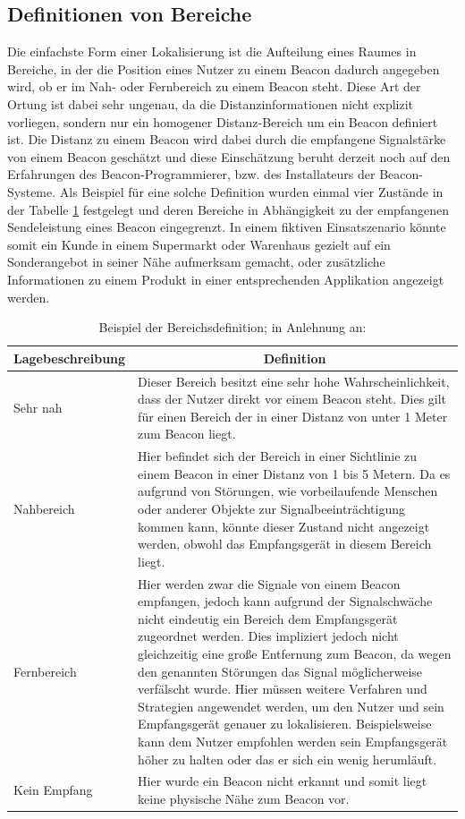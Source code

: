 \subsection{Definitionen von Bereiche}
Die einfachste Form einer Lokalisierung ist die Aufteilung eines Raumes in Bereiche, in der die Position eines Nutzer zu einem Beacon dadurch angegeben wird, ob er im Nah- oder Fernbereich zu einem Beacon steht. Diese Art der Ortung ist dabei sehr ungenau, da die Distanzinformationen nicht explizit vorliegen, sondern nur ein homogener Distanz-Bereich um ein Beacon definiert ist. Die Distanz zu einem Beacon wird dabei durch die empfangene Signalstärke von einem Beacon geschätzt und diese Einschätzung beruht derzeit noch auf den Erfahrungen des Beacon-Programmierer, bzw. des Installateurs der Beacon-Systeme. Als Beispiel für eine solche Definition wurden einmal vier Zustände in der Tabelle \ref{table:Ranging} festgelegt und deren Bereiche in Abhängigkeit zu der empfangenen Sendeleistung eines Beacon eingegrenzt. In einem fiktiven Einsatszenario könnte somit ein Kunde in einem Supermarkt oder Warenhaus gezielt auf ein Sonderangebot in seiner Nähe aufmerksam gemacht, oder zusätzliche Informationen zu einem Produkt in einer entsprechenden Applikation angezeigt werden.    
\begin{table}[H]
\centering
\begin{tabular}{|>{\centering}p{4cm}|m{12cm}|}
\hline
\rowcolor{gray} \textbf{Lagebeschreibung} & \multicolumn{1}{c}{\textbf{Definition}} \\ \hline
Sehr nah & Dieser Bereich besitzt eine sehr hohe Wahrscheinlichkeit, dass der Nutzer direkt vor einem Beacon steht. Dies gilt für einen Bereich der in einer Distanz von unter 1 Meter zum Beacon liegt. \\ \hline
Nahbereich & Hier befindet sich der Bereich in einer Sichtlinie zu einem Beacon in einer Distanz von 1 bis 5 Metern. Da es aufgrund von Störungen, wie vorbeilaufende Menschen oder anderer Objekte zur Signalbeeinträchtigung kommen kann, könnte dieser Zustand nicht angezeigt werden, obwohl das Empfangsgerät in diesem Bereich liegt.\\ \hline
Fernbereich & Hier werden zwar die Signale von einem Beacon empfangen, jedoch kann aufgrund der Signalschwäche nicht eindeutig ein Bereich dem Empfangsgerät zugeordnet werden. Dies impliziert jedoch nicht gleichzeitig eine große Entfernung zum Beacon, da wegen den genannten Störungen das Signal möglicherweise verfälscht wurde. Hier müssen weitere Verfahren und Strategien angewendet werden, um den Nutzer und sein Empfangsgerät genauer zu lokalisieren. Beispielsweise kann dem Nutzer empfohlen werden sein Empfangsgerät höher zu halten oder das er sich ein wenig herumläuft.\\ \hline
Kein Empfang & Hier wurde ein Beacon nicht erkannt und somit liegt keine physische Nähe zum Beacon vor.\\ \hline
\end{tabular}
\caption{Beispiel der Bereichsdefinition; in Anlehnung an: \cite{GSwiB}}
\label{table:Ranging}
\end{table}
